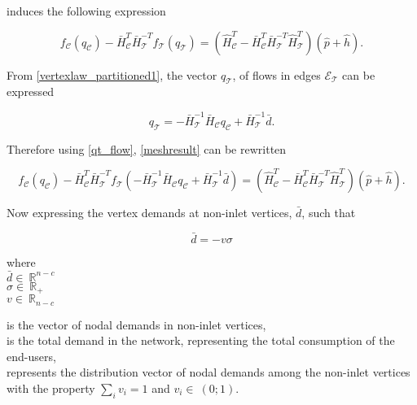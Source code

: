 induces the following expression

\begin{equation}
\label{meshresult}
f_{\mathcal{C}}(q_\mathcal{C}) -\bar{H}^T_{\mathcal{C}}\bar{H}^{-T}_{\mathcal{T}} f_{\mathcal{T}}(q_\mathcal{T}) = (\hat{H}^T_{\mathcal{C}} -\bar{H}^T_{\mathcal{C}}\bar{H}^{-T}_{\mathcal{T}}\hat{H}^T_{\mathcal{T}})(\hat{p} + \hat{h}).
\end{equation}

From \eqref{vertexlaw_partitioned1}, the vector $q_{\mathcal{T}}$, of flows in edges $\mathcal{E}_{\mathcal{T}}$ can be expressed

\begin{equation}
\label{qt_flow}
q_{\mathcal{T}} = -\bar{H}^{-1}_{\mathcal{T}} \bar{H}_{\mathcal{C}} q_\mathcal{C} + \bar{H}^{-1}_{\mathcal{T}} \bar{d}.
\end{equation}

Therefore using \eqref{qt_flow}, \eqref{meshresult} can be rewritten

\begin{equation}
\label{meshresult2}
f_{\mathcal{C}}(q_\mathcal{C}) -\bar{H}^T_{\mathcal{C}}\bar{H}^{-T}_{\mathcal{T}} f_{\mathcal{T}}(-\bar{H}^{-1}_{\mathcal{T}} \bar{H}_{\mathcal{C}} q_\mathcal{C} + \bar{H}^{-1}_{\mathcal{T}} \bar{d}) = (\hat{H}^T_{\mathcal{C}} -\bar{H}^T_{\mathcal{C}}\bar{H}^{-T}_{\mathcal{T}}\hat{H}^T_{\mathcal{T}})(\hat{p} + \hat{h}).
\end{equation} 

Now expressing the vertex demands at non-inlet vertices, $\bar{d}$, such that

\begin{equation}
\label{noninlet_demand}
\bar{d} = - v \sigma
\end{equation}

  \begin{minipage}[t]{0.20\textwidth}
where\\
\hspace*{8mm} $\bar{d} \in \: \mathbb{R}^{n-c}$\\
\hspace*{8mm} $\sigma \in \: \mathbb{R}_{+}$ \\
\newline
\hspace*{8mm} $v \in \: \mathbb{R}_{n-c}$
\end{minipage}
\begin{minipage}[t]{0.68\textwidth}
\vspace*{2mm}
is the vector of nodal demands in non-inlet vertices,\\
is the total demand in the network, representing the total consumption of the end-users,\\
represents the distribution vector of nodal demands among the non-inlet vertices with the property $\sum_{i} v_i = 1 $ and $v_i \in \: (0;1)$.
\end{minipage}

